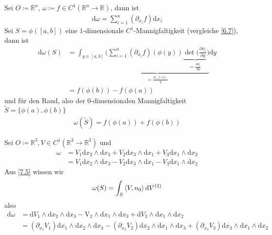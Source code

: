 \begin{example} \label{8.4}
  \begin{enum-arab}
  \item
    Sei $O \coloneq \mathbb{R}^n$, $\omega \coloneq f \in C^1 (\mathbb{R}^n \to \mathbb{R})$, dann ist
    \begin{align*}
      \mathrm d \omega = \sum_{i=1}^n (\partial_{x_i}f) \mathrm d x_i
    \end{align*}
    Sei $S = \phi([a,b])$ eine $1$-dimensionale $C^1$-Mannigfaltigkeit (vergleiche \ref{6.7}), dann ist
    \begin{align*}
      \mathrm d \omega(S) &= \int_{y \in [a,b]} \underbrace{\bigg( \sum_{i=1}^n (\partial_{x_i}f)(\phi(y)) \underbrace{\det ( \tfrac{\partial \phi_i}{\partial y}}_{= \frac{\partial \phi_i}{\partial y}} \bigg)}_{= \frac{\mathrm d (f\circ \phi)}{y}} \mathrm d y \\
      &= f(\phi(b)) - f(\phi(a))
    \end{align*}
    und für den Rand, also der $0$-dimensionalen Mannigfaltigkeit $\tilde S = \{\phi(a), \phi(b)\}$
    \begin{align*}
      \omega(\tilde S) = f(\phi(a)) + f(\phi(b))
    \end{align*}
  \item
    Sei $O \coloneq \mathbb{R}^3, V \in C^1 (\mathbb{R}^3 \to \mathbb{R}^3)$ und
    \begin{align*}
      \omega &= V_1 \mathrm d x_2 \wedge \mathrm d x_3 + V_2 \mathrm d x_3 \wedge \mathrm d x_1 + V_3 \mathrm d x_1 \wedge \mathrm d x_2 \\
      &= V_1 \mathrm d x_2 \wedge \mathrm d x_3 - V_2 \mathrm d x_3 \wedge \mathrm d x_1 - V_3 \mathrm d x_1 \wedge \mathrm d x_2
    \end{align*}
    Aus \ref{7.5} wissen wir
    \begin{align*}
      \omega(S) = \int_S \braket{V, n_0} \mathrm d V^{(2)}
    \end{align*}
    also
    \begin{align*}
      \mathrm d \omega &= \mathrm d V_1 \wedge \mathrm d x_2 \wedge \mathrm d x_3 - \mathrm V_2 \wedge \mathrm d x_1 \wedge \mathrm d x_3 + \mathrm d V_3 \wedge \mathrm d x_1 \wedge \mathrm d x_2 \\
      &= (\partial_{x_1} V_1) \mathrm d x_1 \wedge \mathrm d x_2 \wedge \mathrm d x_3 - (\partial_{x_2} V_2) \mathrm d x_2 \wedge \mathrm d x_1 \wedge \mathrm d x_3 + (\partial_{x_3} V_3) \mathrm d x_3 \wedge \mathrm d x_1 \wedge \mathrm d x_2 \\

\end{align*}
\end{enum-arab}
\end{example}
